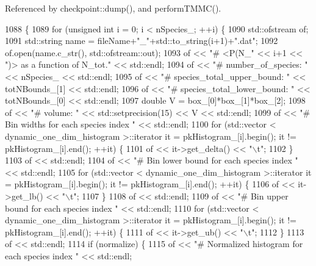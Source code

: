 Referenced by checkpoint\-::dump(), and perform\-T\-M\-M\-C().


\begin{DoxyCode}
1088                                                                                 \{
1089     \textcolor{keywordflow}{for} (\textcolor{keywordtype}{unsigned} \textcolor{keywordtype}{int} i = 0; i < nSpecies\_; ++i) \{
1090         std::ofstream of;
1091         std::string name = fileName+\textcolor{stringliteral}{"\_"}+std::to\_string(i+1)+\textcolor{stringliteral}{".dat"};
1092         of.open(name.c\_str(), std::ofstream::out);
1093         of << \textcolor{stringliteral}{"# <P(N\_"} << i+1 << \textcolor{stringliteral}{")> as a function of N\_tot."} << std::endl;
1094         of << \textcolor{stringliteral}{"# number\_of\_species: "} << nSpecies\_ << std::endl;
1095         of << \textcolor{stringliteral}{"# species\_total\_upper\_bound: "} << totNBounds\_[1] << std::endl;
1096         of << \textcolor{stringliteral}{"# species\_total\_lower\_bound: "} << totNBounds\_[0] << std::endl;
1097         \textcolor{keywordtype}{double} V = box\_[0]*box\_[1]*box\_[2];
1098         of << \textcolor{stringliteral}{"# volume: "} << std::setprecision(15) << V << std::endl;
1099         of << \textcolor{stringliteral}{"# Bin widths for each species index "} << std::endl;
1100         \textcolor{keywordflow}{for} (std::vector < dynamic\_one\_dim\_histogram >::iterator it = pkHistogram\_[i].begin(); it != 
      pkHistogram\_[i].end(); ++it) \{
1101             of << it->get\_delta() << \textcolor{stringliteral}{"\(\backslash\)t"};
1102         \}
1103         of << std::endl;
1104         of << \textcolor{stringliteral}{"# Bin lower bound for each species index "} << std::endl;
1105         \textcolor{keywordflow}{for} (std::vector < dynamic\_one\_dim\_histogram >::iterator it = pkHistogram\_[i].begin(); it != 
      pkHistogram\_[i].end(); ++it) \{
1106             of << it->get\_lb() << \textcolor{stringliteral}{"\(\backslash\)t"};
1107         \}
1108         of << std::endl;
1109         of << \textcolor{stringliteral}{"# Bin upper bound for each species index "} << std::endl;
1110         \textcolor{keywordflow}{for} (std::vector < dynamic\_one\_dim\_histogram >::iterator it = pkHistogram\_[i].begin(); it != 
      pkHistogram\_[i].end(); ++it) \{
1111             of << it->get\_ub() << \textcolor{stringliteral}{"\(\backslash\)t"};
1112         \}
1113         of << std::endl;
1114         \textcolor{keywordflow}{if} (normalize) \{
1115             of << \textcolor{stringliteral}{"# Normalized histogram for each species index "} << std::endl;

\end{DoxyCode}
